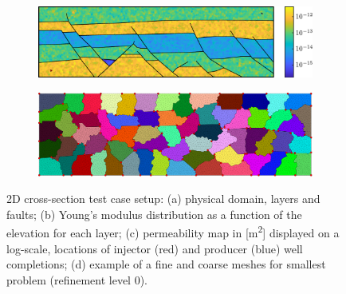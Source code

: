 \begin{figure} [htbp]
\begin{subfigure}[t]{0.48\textwidth}
    \caption{}
    \label{fig:cross_section_young}
  \end{subfigure} \\
  \begin{subfigure}[t]{0.48\textwidth}
    \centering
    \includegraphics[align=b,width=\linewidth]{figs/CrossSection/perm}
    \caption{\label{fig:cross_section_perm}}
  \end{subfigure}
  \hfill
  \begin{subfigure}[t]{0.48\textwidth}
    \centering
    \includegraphics[align=b,width=0.9\linewidth]{figs/CrossSection/coarse_grid}
    \caption{\label{fig:cross_section_coarse_grid}}
  \end{subfigure}
  \caption[2D cross-section test case setup]{\label{fig:cross_section} 2D cross-section test case setup: (a) physical domain, layers and faults; (b) Young's modulus distribution as a function of the elevation for each layer; (c) permeability map in [m\textsuperscript{2}] displayed on a log-scale, locations of injector (red) and producer (blue) well completions; (d) example of a fine and coarse meshes for smallest problem (refinement level 0).}
\end{figure}

